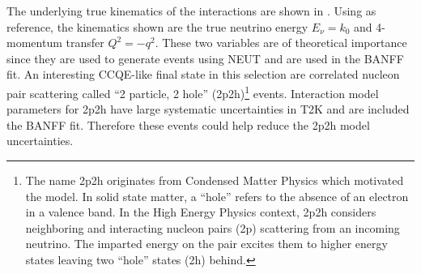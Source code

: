 The underlying true kinematics of the interactions are shown in .
Using  as reference, the kinematics shown
are the true neutrino energy $E_{\nu}=k_{0}$ and 4-momentum transfer
$Q^{2}=-q^{2}$. These two variables are of theoretical importance
since they are used to generate events using NEUT and are used in
the BANFF fit. An interesting CCQE-like final state in this selection
are correlated nucleon pair scattering called ``2 particle, 2 hole''
(2p2h)\footnote{The name 2p2h originates from Condensed Matter Physics which motivated
the model. In solid state matter, a ``hole'' refers to the absence
of an electron in a valence band. In the High Energy Physics context,
2p2h considers neighboring and interacting nucleon pairs (2p) scattering
from an incoming neutrino. The imparted energy on the pair excites
them to higher energy states leaving two ``hole'' states (2h) behind.\medskip{}
} events\cite{Martini:2009uj}. Interaction model parameters for 2p2h
have large systematic uncertainties in T2K and are included the BANFF
fit. Therefore these events could help reduce the 2p2h model uncertainties.

